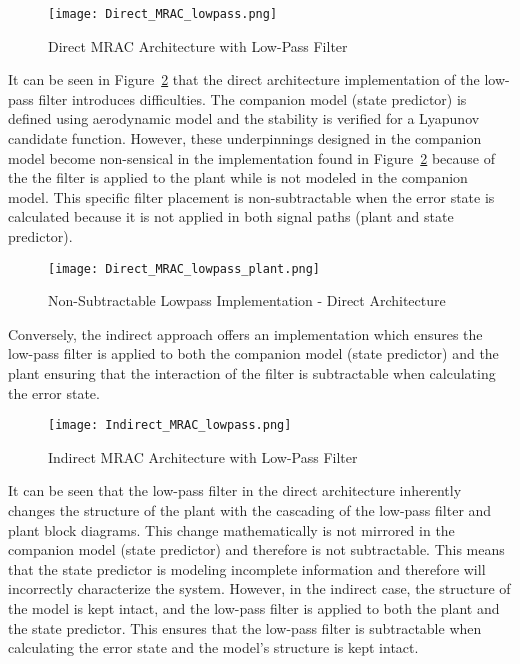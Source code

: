 \begin{figure}[h!]
 \centering
  \texttt{[image: Direct\_MRAC\_lowpass.png]}
  \caption{Direct \ac{MRAC} Architecture with Low-Pass Filter }
  \label{fig:direct_mrac_lowpass}
\end{figure}
 It can be seen in Figure~\ref{fig:direct_mrac_lowpass} that the direct architecture implementation of the low-pass filter introduces difficulties.  The companion model (state predictor) is defined using aerodynamic model and the stability is verified for a Lyapunov candidate function.  However, these underpinnings designed in the companion model become non-sensical in the implementation found in Figure~\ref{fig:direct_mrac_lowpass} because of the the filter is applied to the plant while is not modeled in the companion model.  This specific filter placement is non-subtractable when the error state is calculated because it is not applied in both signal paths (plant and state predictor).
\begin{figure}[h!]
 \centering
  \texttt{[image: Direct\_MRAC\_lowpass\_plant.png]}
  \caption{Non-Subtractable Lowpass Implementation - Direct Architecture}
  \label{fig:direct_mrac_lowpass}
\end{figure}

Conversely, the indirect approach offers an implementation which ensures the low-pass filter is applied to both the companion model (state predictor) and the plant ensuring that the interaction of the filter is subtractable when calculating the error state.
\begin{figure}[h!]
 \centering
  \texttt{[image: Indirect\_MRAC\_lowpass.png]}
  \caption{Indirect \ac{MRAC} Architecture with Low-Pass Filter }
  \label{fig:indirect_mrac_lowpass}
\end{figure}

It can be seen that the low-pass filter in the direct architecture inherently changes the structure of the plant with the cascading of the low-pass filter and plant block diagrams.  This change mathematically is not mirrored in the companion model (state predictor) and therefore is not subtractable.  This means that the state predictor is modeling incomplete information and therefore will incorrectly characterize the system.  However, in the indirect case, the structure of the model is kept intact, and the low-pass filter is applied to both the plant and the state predictor.  This ensures that the low-pass filter is subtractable when calculating the error state and the model's structure is kept intact.  

